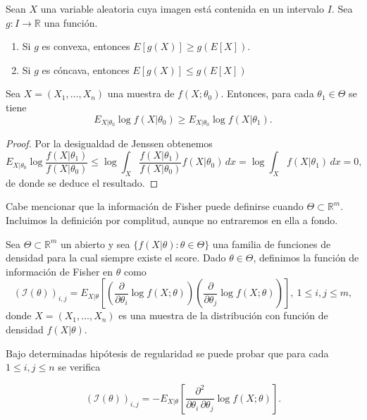     \begin{lem}
        Sean $X$ una variable aleatoria cuya imagen está contenida en un intervalo $I$. Sea $g: I \to \mathbb{R}$ una función.
        \begin{enumerate}
            \item Si $g$ es convexa, entonces $E[g(X)] \ge g(E[X])$.
            \item Si $g$ es cóncava, entonces $E[g(X)] \le g(E[X])$
        \end{enumerate}
    \end{lem}

    \begin{prop} \label{prop:desigualdad}
        Sea $X = (X_1, \ldots, X_n)$ una muestra de $f(X;\theta_0)$. Entonces, para cada $\theta_1 \in \Theta$ se tiene
        \[E_{X|\theta_0} \log f(X|\theta_0) \ge E_{X|\theta_0} \log f(X|\theta_1).\]
    \end{prop}
    \begin{proof}
        Por la desigualdad de Jenssen obtenemos
        \[E_{X|\theta_0} \log \frac{f(X|\theta_1)}{f(X|\theta_0)} \le \log \int_X \frac{f(X|\theta_1)}{f(X|\theta_0)} f(X|\theta_0) \, dx = \log \int_X f(X|\theta_1) \, dx = 0,\]
        de donde se deduce el resultado.
    \end{proof}

    Cabe mencionar que la información de Fisher puede definirse cuando $\Theta \subset \mathbb{R}^m$. Incluimos la definición por complitud, aunque no entraremos en ella a fondo.

    \begin{definition}
        Sea $\Theta \subset \mathbb{R}^m$ un abierto y sea $\{f(X|\theta): \theta \in \Theta\}$ una familia de funciones de densidad para la cual siempre existe el score. Dado $\theta \in \Theta$, definimos la función de información de Fisher en $\theta$ como
        \[{\left(\mathcal{I} \left(\theta \right) \right)}_{i, j} = E_{X|\theta} \left[
          \left(\frac{\partial}{\partial\theta_i} \log f(X;\theta)\right)
          \left(\frac{\partial}{\partial\theta_j} \log f(X;\theta)\right)\right], \ 1 \le i,j \le m,\]
        donde $X = (X_1, \ldots, X_n)$ es una muestra de la distribución con función de densidad $f(X|\theta)$.
    \end{definition}

    Bajo determinadas hipótesis de regularidad se puede probar que para cada $1 \le i, j \le n$ se verifica

    \[{\left(\mathcal{I} \left(\theta \right) \right)}_{i, j} =
      -E_{X|\theta}\left[\frac{\partial^2}{\partial\theta_i \, \partial\theta_j} \log f(X;\theta)
    \right].\]

